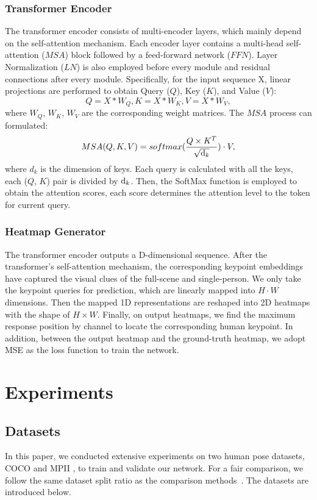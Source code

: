 \documentclass[runningheads]{llncs}
\begin{document}
\subsubsection{Transformer Encoder}
The transformer encoder consists of multi-encoder layers, which mainly depend on the self-attention mechanism. Each encoder layer contains a multi-head self-attention ($MSA$) block followed by a feed-forward network ($FFN$). Layer Normalization ($LN$) is also employed before every module and residual connections after every module. Specifically, for the input sequence X, linear projections are performed to obtain Query ($Q$), Key ($K$), and Value ($V$):
\begin{equation}
    Q = X * W_{Q}, K = X * W_{K}, V = X * W_{V},
\end{equation}
where $W_{Q}$, $W_{K}$, $W_{V}$ are the corresponding weight matrices. The $MSA$ process can formulated:
\begin{equation}
    MSA(Q,K,V) = softmax(\frac{{Q \times {K^T}}}{{\sqrt {{{\rm{d}}_k}} }}) \cdot V,
\end{equation}
where $d_{k}$ is the dimension of keys. Each query is calculated with all the keys, each ($Q$, $K$) pair is divided by ${{{\rm{d}}_k}}$. Then, the SoftMax function is employed to obtain the attention scores, each score determines the attention level to the token for current query. 


\subsubsection{Heatmap Generator}
The transformer encoder outputs a D-dimensional sequence. After the transformer's self-attention mechanism, the corresponding keypoint embeddings have captured the visual clues of the full-scene and single-person. We only take the keypoint queries for prediction, which are linearly mapped into $H\cdot W$ dimensions. Then the mapped 1D representations are reshaped into 2D heatmaps with the shape of $H \times W$. Finally, on output heatmaps, we find the maximum response position by channel to locate the corresponding human keypoint. In addition, between the output heatmap and the ground-truth heatmap, we adopt MSE as the loss function to train the network. 
\section{Experiments} \label{sec:Experiments}
\subsection{Datasets}
In this paper, we conducted extensive experiments on two human pose datasets, COCO \cite{COCO2014microsoft} and MPII \cite{MPII20142d}, to train and validate our network. For a fair comparison, we follow the same dataset split ratio as the comparison methods~\cite{HRNet2019}. The datasets are introduced below.
\end{document}
